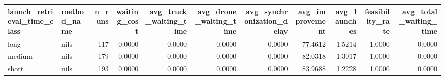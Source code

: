 \begin{tabular}{llrrrrrrrrr}
\toprule
launch_retrieval_time_class & method_name & n_runs & waiting_cost & avg_truck_waiting_time & avg_drone_waiting_time & avg_synchronization_delay & avg_improvement & avg_launches & feasibility_rate & avg_total_waiting_time \\
\midrule
long & nils & 117 & 0.0000 & 0.0000 & 0.0000 & 0.0000 & 77.4612 & 1.5214 & 1.0000 & 0.0000 \\
medium & nils & 179 & 0.0000 & 0.0000 & 0.0000 & 0.0000 & 82.0318 & 1.3017 & 1.0000 & 0.0000 \\
short & nils & 193 & 0.0000 & 0.0000 & 0.0000 & 0.0000 & 83.9688 & 1.2228 & 1.0000 & 0.0000 \\
\bottomrule
\end{tabular}
